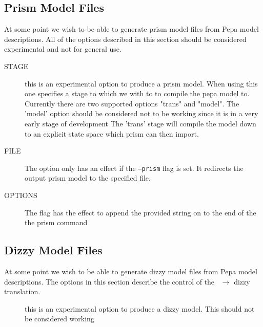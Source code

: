 \subsection{Prism Model Files}
At some point we wish to be able to generate prism
model files from Pepa model descriptions.
All of the options described in this section should be
considered experimental and not for general use.

\begin{description}
\item[ STAGE]
 this is an experimental option to produce
a prism model.
When using this one specifies a stage to which we with to
to compile the pepa model to.
Currently there are two supported options "trans" and
"model". The 'model' option should be considered not to be
working since it is in a very early stage of development
The 'trans' stage will compile the model down to an
explicit state space which prism can then import.

\end{description}

\begin{description}
\item[ FILE]
The  option only has an effect if the
\texttt{--prism} flag is set. It redirects the output
prism model to the specified file.

\end{description}

\begin{description}
\item[ OPTIONS]
The  flag has the effect to
append the provided string on to the end of the
the prism command

\end{description}


\subsection{Dizzy Model Files}
At some point we wish to be able to generate dizzy
model files from Pepa model descriptions.
The options in this section describe the control of
the \pepa\ $\rightarrow$ dizzy translation.

\begin{description}
\item[ ]
 this is an experimental option to produce
a dizzy model. This should not be considered working

\end{description}

